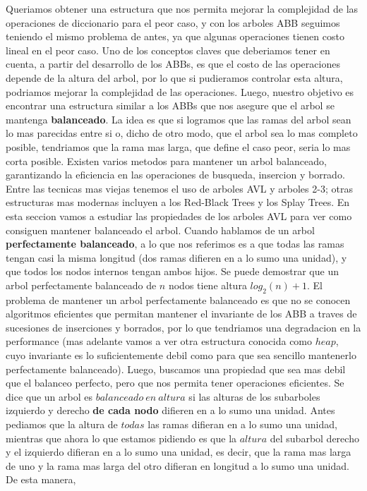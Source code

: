 \documentclass[10pt,a4paper]{article}
\begin{document}
Queriamos obtener una estructura que nos permita mejorar la complejidad de las operaciones de diccionario para el peor caso, y con los arboles ABB seguimos teniendo el mismo problema de antes, ya que algunas operaciones tienen costo lineal en el peor caso. Uno de los conceptos claves que deberiamos tener en cuenta, a partir del desarrollo de los ABBs, es que el costo de las operaciones depende de la altura del arbol, por lo que si pudieramos controlar esta altura, podriamos mejorar la complejidad de las operaciones. Luego, nuestro objetivo es encontrar una estructura similar a los ABBs que nos asegure que el arbol se mantenga \textbf{balanceado}. La idea es que si logramos que las ramas del arbol sean lo mas
parecidas entre si o, dicho de otro modo, que el arbol sea lo mas completo posible, tendriamos que la rama mas larga, que define el caso peor, seria lo mas corta posible.
\newline
\newline
Existen varios metodos para mantener un arbol balanceado, garantizando la eficiencia en las operaciones de busqueda, insercion y borrado. Entre las tecnicas mas viejas tenemos el uso de arboles AVL y arboles 2-3; otras estructuras mas modernas incluyen a los Red-Black Trees y los Splay Trees. En esta seccion vamos a estudiar las propiedades de los arboles AVL para ver como consiguen mantener balanceado el arbol.
\newline
\newline
Cuando hablamos de un arbol \textbf{perfectamente balanceado}, a lo que nos referimos es a que todas las ramas tengan casi la misma longitud (dos ramas difieren en a lo sumo una unidad), y que todos los nodos internos tengan ambos hijos. Se puede demostrar que un arbol perfectamente balanceado de $n$ nodos tiene altura $log_{2}(n) + 1$. El problema de mantener un arbol perfectamente balanceado es que no se conocen algoritmos eficientes que permitan mantener el invariante de los ABB a traves de sucesiones de inserciones y borrados, por lo que tendriamos una degradacion en la performance (mas adelante vamos a ver otra estructura conocida como $heap$, cuyo invariante es lo suficientemente debil como para que sea sencillo mantenerlo perfectamente balanceado).
\newline
\newline
Luego, buscamos una propiedad que sea mas debil que el balanceo perfecto, pero que nos permita tener operaciones eficientes. Se dice que un arbol es $balanceado~en~altura$ si las alturas de los subarboles izquierdo y derecho \textbf{de cada nodo} difieren en a lo sumo una unidad. Antes pediamos que la altura de $todas$ las ramas difieran en a lo sumo una unidad, mientras que ahora lo que estamos pidiendo es que la $altura$ del subarbol derecho y el izquierdo difieran en a lo sumo una unidad, es decir, que la rama mas larga de uno y la rama mas larga del otro difieran en longitud a lo sumo una unidad. De esta manera,
\end{document}
